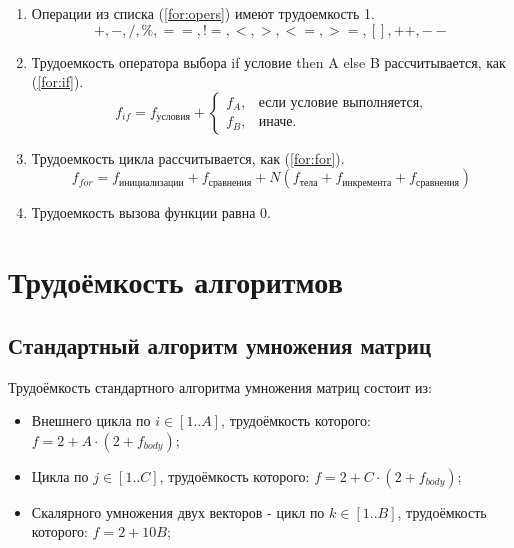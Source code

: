 \begin{enumerate}
    \item Операции из списка (\ref{for:opers}) имеют трудоемкость 1.
    \begin{equation}
        \label{for:opers}
        +, -, /, \%, ==, !=, <, >, <=, >=, [], ++, {-}-
    \end{equation}
    \item Трудоемкость оператора выбора if условие then A else B рассчитывается, как (\ref{for:if}).
    \begin{equation}
        \label{for:if}
        f_{if} = f_{\text{условия}} +
        \begin{cases}
            f_A, & \text{если условие выполняется,}\\
            f_B, & \text{иначе.}
        \end{cases}
    \end{equation}
    \item Трудоемкость цикла рассчитывается, как (\ref{for:for}).
    \begin{equation}
        \label{for:for}
        f_{for} = f_{\text{инициализации}} + f_{\text{сравнения}} + N(f_{\text{тела}} + f_{\text{инкремента}} + f_{\text{сравнения}})
    \end{equation}
    \item Трудоемкость вызова функции равна 0.
\end{enumerate}

\section{Трудоёмкость алгоритмов}

\subsection{Стандартный алгоритм умножения матриц}

Трудоёмкость стандартного алгоритма умножения матриц состоит из:
\begin{itemize}
    \item Внешнего цикла по $i \in [1..A]$, трудоёмкость которого: $f = 2 + A \cdot (2 + f_{body})$;
    \item Цикла по $j \in [1..C]$, трудоёмкость которого: $f = 2 + C \cdot (2 + f_{body})$;
    \item Скалярного умножения двух векторов - цикл по $k \in [1..B]$, трудоёмкость которого: $f = 2 + 10B$;
\end{itemize}


